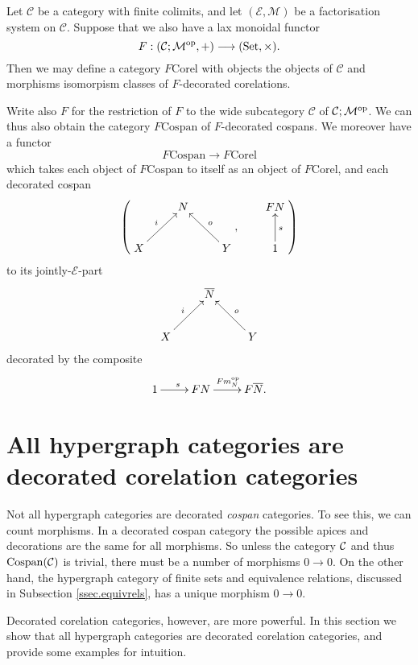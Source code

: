 \begin{corollary}
  Let $\mathcal C$ be a category with finite colimits, and let $(\mathcal E,
  \mathcal M)$ be a factorisation system on $\mathcal C$. Suppose that we also
  have a lax monoidal functor
  \[
    F: (\mathcal C;\mathcal M^{\mathrm{op}},+) \longrightarrow (\mathrm{Set}, \times).
  \]
  Then we may define a category $F\mathrm{Corel}$ with objects the objects of
  $\mathcal C$ and morphisms isomorpism classes of $F$-decorated corelations.

  Write also $F$ for the restriction of $F$ to the wide subcategory $\mathcal
  C$ of $\mathcal C;\mathcal M^{\mathrm{op}}$. We can thus also obtain the category
  $F\mathrm{Cospan}$ of
  $F$-decorated cospans. We moreover have a functor 
  \[
    F\mathrm{Cospan} \to F\mathrm{Corel}
  \]
  which takes each object of $F\mathrm{Cospan}$ to itself as an object of
  $F\mathrm{Corel}$, and each decorated cospan
  \[
    \left(
    \begin{aligned}
      \xymatrix{
	& N \\  
	X \ar[ur]^{i} && Y \ar[ul]_{o}
      }
    \end{aligned}
    ,
    \qquad
    \begin{aligned}
      \xymatrix{
	FN \\
	1 \ar[u]_{s}
      }
    \end{aligned}
    \right)
  \]  
  to its jointly-$\mathcal E$-part
  \[
    \xymatrix{
      & \overline{N} \\  
      X \ar[ur]^{i} && Y \ar[ul]_{o}
    }
  \]
  decorated by the composite
  \[
    \xymatrix{
      1 \ar[r]^s & FN \ar[r]^{Fm_N^\opp} & F\overline{N}.
    }
  \]
\end{corollary}


\section{All hypergraph categories are decorated corelation categories}
Not all hypergraph categories are decorated \emph{cospan} categories. To see
this, we can count morphisms. In a decorated cospan category the possible apices
and decorations are the same for all morphisms. So unless the category $\mathcal C$
and thus $\operatorname{{Cospan}}(\mathcal C)$ is trivial, there must be a number of morphisms $0 \to
0$. On the other hand, the hypergraph category of finite sets and equivalence
relations, discussed in Subsection \ref{ssec.equivrels}, has a unique morphism
$0 \to 0$.

Decorated corelation categories, however, are more powerful. In this section we
show that all hypergraph categories are decorated corelation categories, and
provide some examples for intuition.

